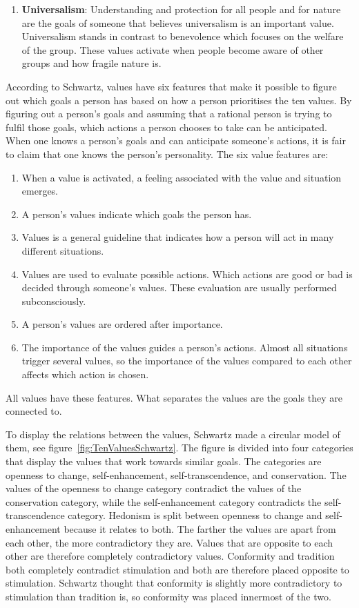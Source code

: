 \begin{enumerate}
    \item \textbf{Universalism}: Understanding and protection for all people and for nature are the goals of someone that believes universalism is an important value. Universalism stands in contrast to benevolence which focuses on the welfare of the group. These values activate when people become aware of other groups and how fragile nature is. 
\end{enumerate}

According to Schwartz, values have six features that make it possible to figure out which goals a person has based on how a person prioritises the ten values. By figuring out a person's goals and assuming that a rational person is trying to fulfil those goals, which actions a person chooses to take can be anticipated. When one knows a person's goals and can anticipate someone's actions, it is fair to claim that one knows the person's personality. The six value features are:

\begin{enumerate}
    \item When a value is activated, a feeling associated with the value and situation emerges.
    \item A person’s values indicate which goals the person has. 
    \item Values is a general guideline that indicates how a person will act in many different situations.
    \item Values are used to evaluate possible actions. Which actions are good or bad is decided through someone's values. These evaluation are usually performed subconsciously.
    \item A person’s values are ordered after importance.
    \item The importance of the values guides a person’s actions. Almost all situations trigger several values, so the importance of the values compared to each other affects which action is chosen.
\end{enumerate}

All values have these features. What separates the values are the goals they are connected to. 

To display the relations between the values, Schwartz made a circular model of them, see figure~\ref{fig:TenValuesSchwartz}. The figure is divided into four categories that display the values that work towards similar goals. The categories are openness to change, self-enhancement, self-transcendence, and conservation. The values of the openness to change category contradict the values of the conservation category, while the self-enhancement category contradicts the self-transcendence category. Hedonism is split between openness to change and self-enhancement because it relates to both. The farther the values are apart from each other, the more contradictory they are. Values that are opposite to each other are therefore completely contradictory values. Conformity and tradition both completely contradict stimulation and both are therefore placed opposite to stimulation. Schwartz thought that conformity is slightly more contradictory to stimulation than tradition is, so conformity was placed innermost of the two.

